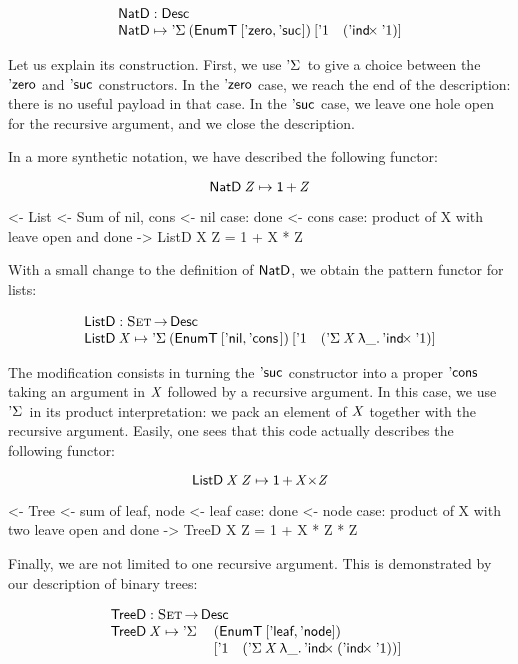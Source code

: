 \[\stk{
\NatD : \Desc \\
\NatD \mapsto \DSigma{(\EnumT{[ \NatZero, \NatSuc{\!} ]})}
                     {[ \DUnit \quad (\DIndx{\DUnit}) ]}
}\]

Let us explain its construction. First, we use $\DSigma{\!}{\!}$ to
give a choice between the $\NatZero$ and $\NatSuc{\!}$
constructors. In the $\NatZero$ case, we reach the end of the
description: there is no useful payload in that case. In the
$\NatSuc{\!}$ case, we leave one hole open for the recursive argument,
and we close the description.

In a more synthetic notation, we have described the following functor:

\[    \NatD\: \V{Z} \mapsto \Unit \mathop{\D{+}} \V{Z}    \]

\begin{wstructure}
<- List
    <- Sum of nil, cons
    <- nil case: done
    <- cons case: product of X with leave open and done
    -> ListD X Z = 1 + X * Z
\end{wstructure}

With a small change to the definition of $\NatD$, we obtain the
pattern functor for lists:

\[\stk{
\ListD : \Set \To \Desc \\
\ListD \: \V{X} \mapsto \DSigma{(\EnumT{[ \ListNil, \ListCons{\!}{\!} ]})}
                           {[ \DUnit \quad (\DSigma{\V{X}}{\LAM{\_} \DIndx{\DUnit}}) ]}
}\]


The modification consists in turning the $\NatSuc{\!}$ constructor
into a proper $\ListCons{\!}{\!}$ taking an argument in $\V{X}$
followed by a recursive argument. In this case, we use
$\DSigma{\!}{\!}$ in its product interpretation: we pack an element of
$\V{X}$ together with the recursive argument. Easily, one sees that
this code actually describes the following functor:

\[    \ListD\: \V{X}\: \V{Z} \mapsto \Unit \mathop{\D{+}} \V{X} \D{\ensuremath{\times}} \V{Z}     \]

\begin{wstructure}
<- Tree
    <- sum of leaf, node
    <- leaf case: done
    <- node case: product of X with two leave open and done
    -> TreeD X Z = 1 + X * Z * Z
\end{wstructure}

Finally, we are not limited to one recursive argument. This is
demonstrated by our description of binary trees:

\[\stk{
\TreeD : \Set \To \Desc \\
\begin{array}{@{}ll}
\TreeD \: \V{X} \mapsto \DSigma{ & (\EnumT{[ \TreeLeaf, \TreeNode ]}) \\}
                           { & [ \DUnit \quad (\DSigma{\V{X}}{\LAM{\_} \DIndx{(\DIndx{\DUnit})}}) ]}
\end{array}
}\]

